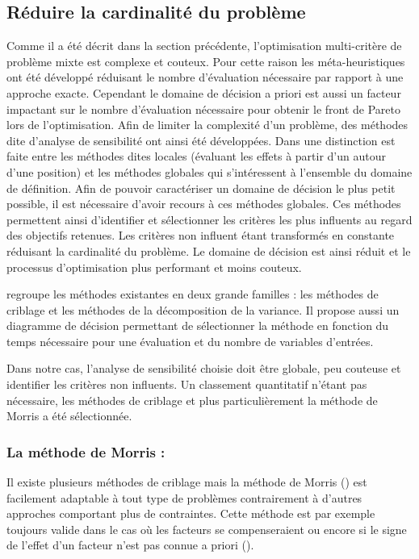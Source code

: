 \subsection{Réduire la cardinalité du problème} %
\label{sub:reduire_la_cardinalite_du_probleme}
Comme il a été décrit dans la section précédente, l’optimisation multi-critère de
problème mixte est complexe et couteux. Pour cette raison les méta-heuristiques
ont été développé réduisant le nombre d’évaluation nécessaire par rapport à une
approche exacte.
Cependant le domaine de décision a priori est aussi un facteur impactant sur le
nombre d’évaluation nécessaire pour obtenir le front de Pareto lors de l’optimisation.
Afin de limiter la complexité d’un problème, des méthodes dite d’analyse de sensibilité
ont ainsi été développées.
Dans \cite{Iooss2011} une distinction est faite entre les méthodes dites locales
(évaluant les effets à partir d’un autour d’une position) et les méthodes globales qui
s’intéressent à l’ensemble du domaine de définition. Afin de pouvoir caractériser
un domaine de décision le plus petit possible, il est nécessaire d’avoir recours à
ces méthodes globales.
Ces méthodes permettent ainsi d’identifier et sélectionner les critères les plus influents
au regard des objectifs retenues. Les critères non influent étant transformés en
constante réduisant la cardinalité du problème. Le domaine de décision est ainsi
réduit et le processus d’optimisation plus performant et moins couteux.

\cite{Iooss2011} regroupe les méthodes existantes en deux grande familles : les
méthodes de criblage et les méthodes de la décomposition de la variance. Il propose
aussi un diagramme de décision permettant de sélectionner la méthode en fonction
du temps nécessaire pour une évaluation et du nombre de variables d’entrées.

Dans notre cas, l’analyse de sensibilité choisie doit être globale, peu couteuse
et identifier les critères non influents. Un classement quantitatif n’étant pas
nécessaire, les méthodes de criblage et plus particulièrement la méthode de Morris
a été sélectionnée.

\subsubsection{La méthode de Morris :} %
\label{ssub:la_methode_de_morris}
Il existe plusieurs méthodes de criblage mais la méthode de Morris (\cite{Morris1991161})
est facilement adaptable à tout type de problèmes contrairement à d’autres approches
comportant plus de contraintes. Cette méthode est par exemple toujours valide dans le cas où
les facteurs se compenseraient ou encore si le signe de l’effet d’un facteur n’est pas
connue a priori (\cite{Saltelli2004}).


